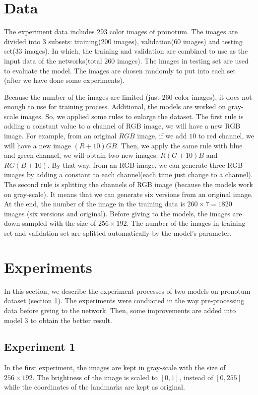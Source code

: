 \documentclass[12pt,a4paper]{article}
\begin{document}
\section{Data}
\label{sectionData}
The experiment data includes 293 color images of pronotum. The images are divided into 3 subsets: training($200$ images), validation($60$ images) and testing set($33$ images). In which, the training and validation are combined to use as the input data of the networks(total $260$ images). The images in testing set are used to evaluate the model. The images are chosen randomly to put into each set (after we have done some experiments).

Because the number of the images are limited (just $260$ color images), it does not enough to use for training process. Additional, the models are worked on gray-scale images. So, we applied some rules to enlarge the dataset. The first rule is adding a constant value to a channel of RGB image, we will have a new RGB image. For example, from an original $RGB$ image, if we add $10$ to red channel, we will have a new image $(R+10)GB$. Then, we apply the same rule with blue and green channel, we will obtain two new images: $R(G+10)B$ and $RG(B+10)$. By that way, from an RGB image, we can generate three RGB images by adding a constant to each channel(each time just change to a channel). The second rule is splitting the channels of RGB image (because the models work on gray-scale). It means that we can generate six versions from an original image. At the end, the number of the image in the training data is $ 260 \times 7 = 1820$ images (six versions and original). Before giving to the models, the images are down-sampled with the size of $256 \times 192$. The number of the images in training set and validation set are splitted automatically by the model's parameter.
\section{Experiments}
In this section, we describe the experiment processes of two models on pronotum dataset (section \ref{sectionData}). The experiments were conducted in the way pre-processing data before giving to the network. Then, some improvements are added into model 3 to obtain the better result.
\subsection{Experiment 1}
In the first experiment, the images are kept in gray-scale with the size of $256 \times 192$. The brightness of the image is scaled to $[0,1]$, instead of $[0,255]$ while the coordinates of the landmarks are kept as original.
\end{document}
